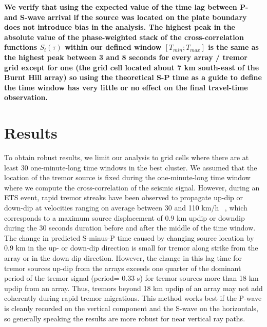 \documentclass[draft]{agujournal2019}
\begin{document}
\textbf{We verify that using the expected value of the time lag between P- and S-wave arrival if the source was located on the plate boundary does not introduce bias in the analysis. The highest peak in the absolute value of the phase-weighted stack of the cross-correlation functions $S_i(\tau)$ within our defined window $\left[ T_{min} ; T_{max} \right]$ is the same as the highest peak between 3 and 8 seconds for every array / tremor grid  except for one (the grid cell located about 7 km south-east of the Burnt Hill array) so using the theoretical S-P time as a guide to define the time window has very little or no effect on the final travel-time observation.}

\section{Results}

To obtain robust results, we limit our analysis to grid cells where there are at least 30 one-minute-long time windows in the best cluster. We assumed that the location of the tremor source is fixed during the one-minute-long time window where we compute the cross-correlation of the seismic signal. However, during an ETS event, rapid tremor streaks have been observed to propagate up-dip or down-dip at velocities ranging on average between 30 and 110 km/h ~\cite{GHO_2010_G3}, which corresponds to a maximum source displacement of 0.9 km updip or downdip during the 30 seconds duration before and after the middle of the time window. The change in predicted S-minus-P time caused by changing source location by 0.9 km in the up- or down-dip direction is small for tremor along strike from the array or in the down dip direction.  However, the change in this lag time for tremor sources up-dip from the arrays exceeds one quarter of the dominant period of the tremor signal (period= 0.33 s) for tremor sources more than 18 km updip from an array. Thus, tremors beyond 18 km updip of an array may not add coherently during rapid tremor migrations. This method works best if the P-wave is cleanly recorded on the vertical component and the S-wave on the horizontals, so generally speaking the results are more robust for near vertical ray paths. \\
\end{document}
